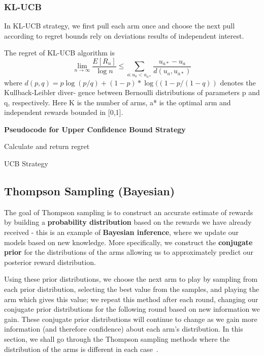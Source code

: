     \subsubsection{KL-UCB}
    In KL-UCB strategy, we first pull each arm once and choose the next pull according to regret bounds rely on deviations results of independent interest. \citep{Garivier2011}
    \par
    The regret of KL-UCB algorithm is $$\lim_{n\to \infty} \frac{E[R_n]}{\log n} \leq  \sum_{a:u_a < u_{a*}} \frac{u_{a*}-u_a}{d(u_a,u_{a*})}  $$ 
    where $d(p, q) = p \log(p/q) + (1 - p) * \log((1 - p/(1 - q))$ denotes the Kullback-Leibler diver- gence between Bernoulli distributions of parameters p and q, respectively. Here K is the number of arms, a* is the optimal arm and independent rewards bounded in [0,1].\citep{Garivier2011}
    \par
    \textbf{Pseudocode for Upper Confidence Bound Strategy}
    \newline
    \begin{algorithm}[H]
        Calculate and return regret
        \caption{UCB Strategy}\label{alg:ucb_algorithm}
    \end{algorithm}

    \subsection{Thompson Sampling (Bayesian)}\label{subsec:thompson-sampling-(bayesian)}
    The goal of Thompson sampling is to construct an accurate estimate of rewards by building a \textbf{probability distribution} based on the rewards we have already received - this is an example of \textbf{Bayesian inference}, where we update our models based on new knowledge.
    More specifically, we construct the \textbf{conjugate prior} for the distributions of the arms allowing us to approximately predict our posterior reward distribution.
    \par
    Using these prior distributions, we choose the next arm to play by sampling from each prior distribution, selecting the best value from the samples, and playing the arm which gives this value;
    we repeat this method after each round, changing our conjugate prior distributions for the following round based on new information we gain.
    These conjugate prior distributions will continue to change as we gain more information (and therefore confidence) about each arm's distribution.
    In this section, we shall go through the Thompson sampling methods where the distribution of the arms is different in each case~\citep{agrawal2012analysis}.

